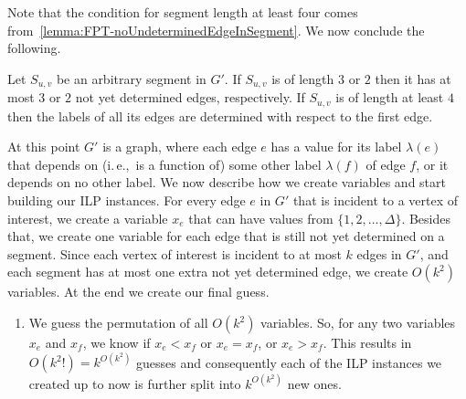 \documentclass[a4paper,UKenglish,cleveref, autoref, thm-restate]{lipics-v2021}
\newcommand{\ie}{i.\,e.,\ }
\newcounter{guesscounter}
\begin{document}
%
Note that the condition for segment length at least four comes from~\cref{lemma:FPT-noUndeterminedEdgeInSegment}.
We now conclude the following.
\begin{corollary}\label{cor:FPT-4determined}
    Let $S_{u,v}$ be an arbitrary segment in $G'$.
    If $S_{u,v}$ is of length $3$ or $2$ then it has at most $3$ or $2$ not yet determined edges, respectively.
    If $S_{u,v}$ is of length at least $4$ then the labels of all its edges are determined with respect to the first edge. 
\end{corollary}

At this point $G'$ is a graph, where each edge $e$ has a value for its label $\lambda(e)$
that depends on (\ie is a function of) some other label $\lambda(f)$ of edge $f$,
or it depends on no other label.
We now describe how we create variables and start building our ILP instances. 
For every edge $e$ in $G'$ that is incident to a vertex of interest, we create a variable $x_e$ that can have values from $ \{1, 2, \dots, \Delta\}$.
Besides that, we create one variable for each edge that is still not yet determined on a segment.
Since each vertex of interest is incident to at most $k$ edges in $G'$, and each segment has at most one extra not yet determined edge, we create $O(k^2)$ variables.
At the end we create our final guess.
\begin{enumerate}[G-1.]
\setcounter{enumi}{\value{guesscounter}}
    \item \label{FPT:guessallPermutations}
We guess the permutation of all $O(k^2)$ variables.
So, for any two variables $x_e$ and $x_f$, we know if $x_e < x_f$ or $x_e = x_f$, or $x_e > x_f$.
This results in $O(k^2!) = k^{O(k^2)}$ guesses
and consequently
each of the ILP instances we created up to now is further split into $k^{O(k^2)}$ new ones.
\end{enumerate}
\end{document}
